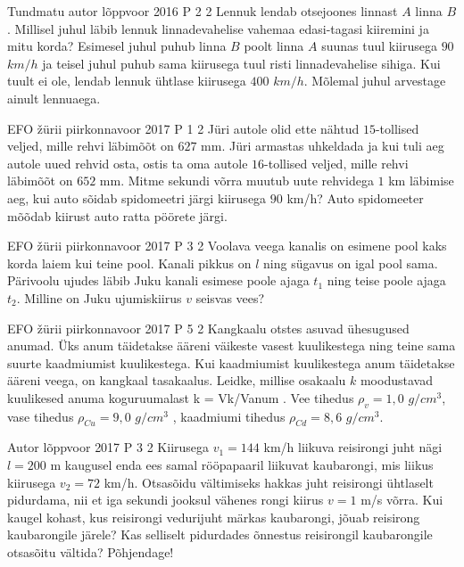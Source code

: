 \documentclass[11pt]{article}
\begin{document}
{%
{Tundmatu autor} %
{lõppvoor} %
{2016} %
{P 2} %
{2} %
{
\ifStatement
Lennuk lendab otsejoones linnast $A$ linna $B$. Millisel juhul läbib lennuk linnadevahelise vahemaa edasi-tagasi kiiremini ja mitu korda? Esimesel juhul puhub linna $B$ poolt linna $A$ suunas tuul kiirusega $90$ $km/h$ ja teisel juhul puhub sama kiirusega tuul risti linnadevahelise sihiga. Kui tuult ei ole, lendab lennuk ühtlase kiirusega $400$ $km/h$. Mõlemal juhul arvestage ainult lennuaega.
\fi
}

{EFO žürii} %
{piirkonnavoor} %
{2017} %
{P 1} %
{2} %
{
\ifStatement
Jüri autole olid ette nähtud $15$-tollised veljed, mille rehvi läbimõõt on $627$ mm. Jüri armastas uhkeldada ja kui tuli aeg autole uued rehvid osta, ostis ta oma autole $16$-tollised veljed, mille rehvi läbimõõt on $652$ mm. Mitme sekundi võrra muutub uute rehvidega $1$ km läbimise aeg, kui auto sõidab spidomeetri järgi kiirusega $90$ km/h? Auto spidomeeter mõõdab kiirust auto ratta pöörete järgi. 
\fi
}

{EFO žürii} %
{piirkonnavoor} %
{2017} %
{P 3} %
{2} %
{
\ifStatement
Voolava veega kanalis on esimene pool kaks korda laiem kui teine pool. Kanali pikkus on $l$ ning sügavus on igal pool sama. Pärivoolu ujudes läbib Juku kanali esimese poole ajaga $t_1$ ning teise poole ajaga $t_2$. Milline on Juku ujumiskiirus $v$ seisvas vees?
\fi
}

{EFO žürii} %
{piirkonnavoor} %
{2017} %
{P 5} %
{2} %
{
\ifStatement
Kangkaalu otstes asuvad ühesugused anumad. Üks anum täidetakse ääreni väikeste vasest kuulikestega ning teine sama suurte kaadmiumist kuulikestega. Kui kaadmiumist kuulikestega anum täidetakse ääreni veega, on kangkaal tasakaalus. Leidke, millise osakaalu $k$ moodustavad kuulikesed anuma koguruumalast k = Vk/Vanum . Vee tihedus $\rho_v = 1,0$ $g/cm^3$, vase tihedus $\rho_{Cu} = 9,0$ $g/cm^3$ , kaadmiumi tihedus $\rho_{Cd} = 8,6$ $g/cm^3$.
\fi
}

{Autor} %
{lõppvoor} %
{2017} %
{P 3} %
{2} %
{
\ifStatement
Kiirusega $v_1 = 144$ km/h liikuva reisirongi juht nägi $l = 200$ m kaugusel enda ees samal rööpapaaril liikuvat kaubarongi, mis liikus kiirusega $v_2 = 72$ km/h. Otsasõidu vältimiseks hakkas juht reisirongi ühtlaselt pidurdama, nii et iga sekundi jooksul vähenes rongi kiirus $v = 1$ m/s võrra. Kui kaugel kohast, kus reisirongi vedurijuht märkas kaubarongi, jõuab reisirong kaubarongile järele? Kas selliselt pidurdades õnnestus reisirongil kaubarongile otsasõitu vältida? Põhjendage!
\fi
}

}
\end{document}
